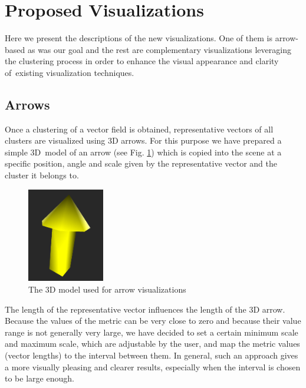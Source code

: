 \section{Proposed Visualizations}
\label{sec:analysis-visualizations}

Here we present the descriptions of the new visualizations. One of them is arrow-based as was our goal and the rest are complementary visualizations leveraging the clustering process in order to enhance the visual appearance and clarity of~existing visualization techniques.

\subsection{Arrows}
\label{subsec:analysis-visualizations-arrows}

Once a clustering of a vector field is obtained, representative vectors of all clusters are visualized using 3D arrows. For this purpose we have prepared a simple 3D~model of an arrow (see Fig. \ref{fig:meshdiff-arrow_model8}) which is copied into the scene at a specific position, angle and scale given by the representative vector and the cluster it belongs to.

\begin{figure}[h]
\centering
\includegraphics[width=0.3\textwidth]{./img/arrow_model.PNG}
\caption[Arrow model]{The 3D model used for arrow visualizations}
\label{fig:meshdiff-arrow_model8}
\end{figure}

The length of the representative vector influences the length of the 3D arrow. Because the values of the metric can be very close to zero and because their value range is not generally very large, we have decided to set a certain minimum scale and maximum scale, which are adjustable by the user, and map the metric values (vector lengths) to the interval between them. In general, such an approach gives a more visually pleasing and clearer results, especially when the interval is chosen to be large enough.

